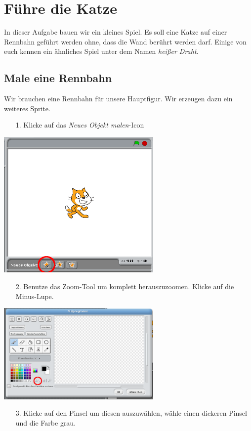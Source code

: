 \section{Führe die Katze}
In dieser Aufgabe bauen wir ein kleines Spiel. Es soll eine Katze auf einer Rennbahn gef{\"u}hrt werden ohne, dass die Wand ber{\"u}hrt werden darf. Einige von euch kennen ein {\"a}hnliches Spiel unter dem Namen \emph{hei{\ss}er Draht}.
\subsection{Male eine Rennbahn}
Wir brauchen eine Rennbahn für unsere Hauptfigur. Wir erzeugen dazu ein weiteres Sprite.
\begin{itemize}
\item[1. ] Klicke auf das \textit{Neues Objekt malen}-Icon
\end{itemize}
\includegraphics[width=0.6\textwidth]{images/aufgabe4_neues_objekt_malen.png}
\begin{itemize}
\item[2. ] Benutze das Zoom-Tool um komplett herauszuzoomen. Klicke auf die Minus-Lupe.
\end{itemize}
\includegraphics[width=0.6\textwidth]{images/aufgabe4_zoom.png}
\begin{itemize}
\item[3. ] Klicke auf den Pinsel um diesen auszuw{\"a}hlen, w{\"a}hle einen dickeren Pinsel und die Farbe grau.
\end{itemize}
